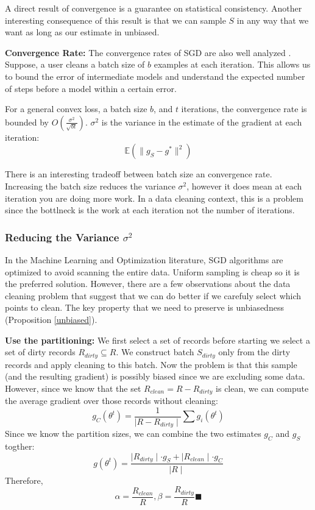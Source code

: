 A direct result of convergence is a guarantee on statistical consistency.
Another interesting consequence of this result is that we can sample $S$ in any way that we want
as long as our estimate in unbiased.

\vspace{0.5em}

\noindent\textbf{ Convergence Rate: } The convergence rates of SGD are also well analyzed \cite{dekel2012optimal,bertsekas2011incremental,zhao2014stochastic}. 
Suppose, a user cleans a batch size of $b$ examples at each iteration.
This allows us to bound the error of intermediate models and understand the expected number of steps before a model within a certain error. 

\begin{proposition}
For a general convex loss, a batch size $b$, and $t$ iterations, the convergence rate is bounded by $O(\frac{\sigma^2}{\sqrt{bt}})$. 
$\sigma^2$ is the variance in the estimate of the gradient at each iteration:
\[
\mathbb{E}(\|g_S - g^*\|^2)
\]
\end{proposition}

There is an interesting tradeoff between batch size an convergence rate.
Increasing the batch size reduces the variance $\sigma^2$, however it does
mean at each iteration you are doing more work.
In a data cleaning context, this is a problem since the bottlneck is the work at 
each iteration not the number of iterations.

\subsubsection{Reducing the Variance $\sigma^2$}\label{dist-samp}
In the Machine Learning and Optimization literature, SGD algorithms are optimized to avoid scanning the entire data.
Uniform sampling is cheap so it is the preferred solution.
However, there are a few observations about the data cleaning problem that suggest that we can do better if we carefuly select which points to clean.
The key property that we need to preserve is unbiasedness (Proposition \ref{unbiased}).

\vspace{0.5em}

\noindent\textbf{Use the partitioning: }
We first select a set of records before starting we select a set of dirty records $R_{dirty} \subseteq R$. 
We construct batch $S_{dirty}$ only from the dirty records and apply cleaning to this batch.
Now the problem is that this sample (and the resulting gradient) is possibly biased since we are excluding some data.
However, since we know that the set $R_{clean} = R - R_{dirty}$ is clean, we can compute the average gradient over those records without cleaning:
\[
g_C(\theta^{t}) = \frac{1}{\mid R - R_{dirty} \mid} \sum g_i(\theta^{t})
\]
Since we know the partition sizes, we can combine the two estimates $g_C$ and $g_S$ togther:
\[
g(\theta^{t}) = \frac{\mid R_{dirty} \mid \cdot g_S + \mid R_{clean} \mid \cdot g_C  }{\mid R \mid}
\]
Therefore,
\[
\alpha = \frac{R_{clean}}{R}, \beta = \frac{R_{dirty}}{R} \blacksquare
\]

